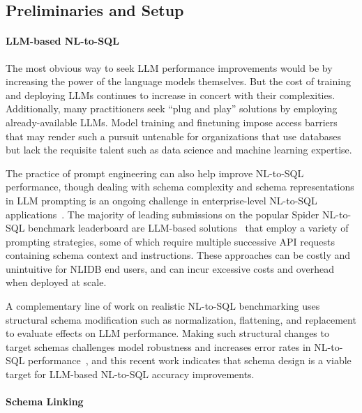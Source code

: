 \subsection{Preliminaries and Setup}

\paragraph{\textbf{LLM-based NL-to-SQL}}

The most obvious way to seek LLM performance improvements would be by increasing the power of the language models themselves. 
But the cost of training and deploying LLMs continues to increase in concert with their complexities. 
Additionally, many practitioners seek ``plug and play'' solutions by employing already-available LLMs. 
Model training and finetuning impose access barriers that may render such a pursuit untenable for organizations that use databases but lack the requisite talent such as data science and machine learning expertise.

The practice of prompt engineering can also help improve NL-to-SQL performance, 
though dealing with schema complexity and schema representations in LLM prompting is an ongoing challenge in enterprise-level NL-to-SQL applications~\cite{floratou2024nl2sql}.
The majority of leading submissions on the popular Spider NL-to-SQL benchmark leaderboard are LLM-based solutions~\cite{gao2023texttosql,pourreza2023dinsql,dong2023c3} that employ a variety of prompting strategies, some of which require multiple successive API requests containing schema context and instructions.
These approaches can be costly and unintuitive for NLIDB end users, and can incur excessive costs and overhead when deployed at scale. 

A complementary line of work on realistic NL-to-SQL benchmarking uses structural schema modification such as normalization, flattening, and replacement to evaluate effects on LLM performance.
Making such structural changes to target schemas challenges model robustness and increases error rates in NL-to-SQL performance~\cite{10.14778/3494124.3494139}, and this recent work indicates that schema design is a viable target for LLM-based NL-to-SQL accuracy improvements.

\paragraph{\textbf{Schema Linking}}

